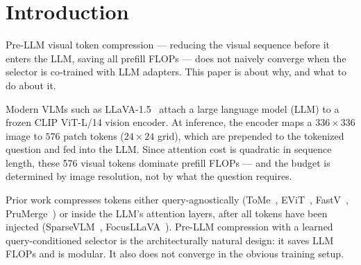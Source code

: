 \documentclass{article}
\begin{document}
\begin{abstract}
To explain why compression does not close the \textsc{LoRA-576} gap, we
document three training-dynamics pathologies we encountered while training a
query-conditioned visual-token selector co-optimized with LLM adapters before
the LLM. We present them as concrete, testable hypotheses about pre-LLM
trainable compression more broadly; their universality is an open question we
explicitly invite future work to resolve. \emph{Co-adaptation oscillation}
produces limit cycles whose period grew from approximately 5K to 15K steps as
the selector learning rate dropped $25{\times}$ across the two finite-period
measurements available (the frozen-pooler control has no cycle). We report this
as a qualitative trend, not a scaling law; two data points are insufficient to
fit a functional form. \emph{BudgetPredictor
collapse} sends per-sample token budgets to $k_{\max}$ whenever
$\lambda_b\!\leq\!0.05$, with a narrow stable window of $[0.08, 0.15]$.
\emph{Warm-start dependence} prevents from-scratch convergence at LLaVA-1.5
scale across two selector variants and three LoRA capacities. We sidestep each
pathology with a parameter-free token merge, a calibrated $\lambda_b$, and a
staged curriculum on a converged base.
\end{abstract}

\section{Introduction}
\label{sec:intro}

Pre-LLM visual token compression — reducing the visual sequence before it enters the
LLM, saving all prefill FLOPs — does not naively converge when the selector is
co-trained with LLM adapters. This paper is about why, and what to do about it.

Modern VLMs such as LLaVA-1.5~\cite{liu2024llava} attach a large language model (LLM)
to a frozen CLIP ViT-L/14 vision encoder. At inference, the encoder maps a
$336\times336$ image to $576$ patch tokens ($24\times24$ grid), which are prepended to
the tokenized question and fed into the LLM. Since attention cost is quadratic in
sequence length, these 576 visual tokens dominate prefill FLOPs — and the budget is
determined by image resolution, not by what the question requires.

Prior work compresses tokens either query-agnostically (ToMe~\cite{bolya2022token},
EViT~\cite{liang2022evit}, FastV~\cite{chen2024fastv},
PruMerge~\cite{shang2024llava}) or inside the LLM's attention layers, after all tokens
have been injected (SparseVLM~\cite{zhang2025sparsevlm},
FocusLLaVA~\cite{zhu2024focusllava}). Pre-LLM compression with a learned
query-conditioned selector is the architecturally natural design: it saves LLM FLOPs
and is modular. It also does not converge in the obvious training setup.
\end{document}
